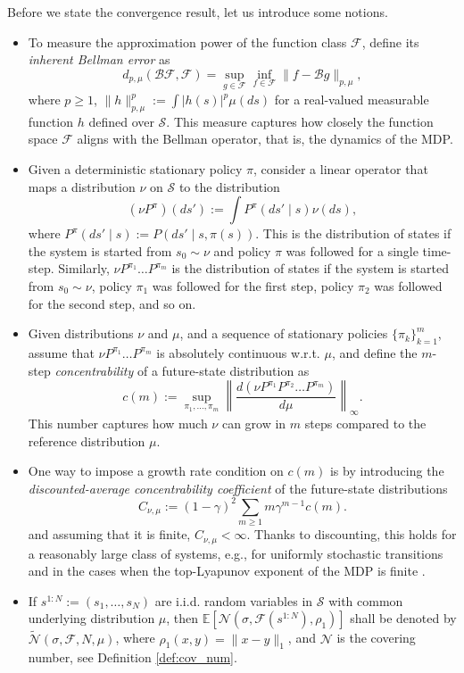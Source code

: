 \documentclass{article}
\numberwithin{equation}{section}
\newcommand{\cS}{\mathcal{S}}
\begin{document}
Before we state the convergence result, let us introduce some notions.
\begin{itemize}
    \item To measure the approximation power of the function class \(\mathcal{F}\), define its \textit{inherent Bellman error} as
    $$
    d_{p,\mu}(\mathcal{B} \mathcal{F}, \mathcal{F})=\sup _{g \in \mathcal{F}} \inf _{f \in \mathcal{F}}\|f-\mathcal{B} g\|_{p,\mu},
    $$
    where \(p\geq 1\), \(\|h\|_{p,\mu}^p:=\int |h(s)|^p \mu(ds)\) for a real-valued measurable function \(h\) defined over \(\cS\). This measure captures how closely the function space \(\mathcal{F}\) aligns with the Bellman operator, that is, the dynamics of the MDP.
    \item Given a deterministic stationary policy $\pi$, consider a linear operator that maps a distribution \(\nu\) on \(\cS\) to the distribution
    $$
    \left(\nu P^\pi\right)(d s'):=\int P^\pi(d s' \mid s) \nu(d s),
    $$
    where \( P^\pi(d s' \mid s):=P(d s' \mid s, \pi(s) )  \).
    This is the distribution of states if the system is started from \(s_0 \sim \nu\) and policy \(\pi\) was followed for a single time-step. Similarly, \( \nu P^{\pi_1} \ldots P^{\pi_m} \) is the distribution of states if the system is started from \(s_0 \sim \nu\), policy \(\pi_1\) was followed for the first step, policy \(\pi_2\) was followed for the second step, and so on.
    \item Given distributions \(\nu\) and \(\mu\), and a sequence of stationary policies \(\{\pi_k\}_{k=1}^m\), assume that \( \nu P^{\pi_1} \ldots P^{\pi_m} \) is absolutely continuous w.r.t. \(\mu\), and define the \(m\)-step \textit{concentrability} of a future-state distribution as
    \[
        c(m) := \sup _{\pi_1, \ldots, \pi_m}\left\|\frac{d\left(\nu P^{\pi_1} P^{\pi_2} \ldots P^{\pi_m}\right)}{d \mu}\right\|_{\infty}.
    \]
    This number captures how much \(\nu\) can grow in \(m\) steps compared to the reference distribution \(\mu\).
    \item One way to impose a growth rate condition on \(c(m)\) is by introducing the \textit{discounted-average concentrability coefficient} of the future-state distributions
    \[
        C_{\nu, \mu} := (1-\gamma)^2 \sum_{m \geq 1} m \gamma^{m-1} c(m).
    \]
    and assuming that it is finite, \( C_{\nu, \mu} < \infty \). Thanks to discounting, this holds for a reasonably large class of systems, e.g., for uniformly stochastic transitions \citep{munos2003error} and in the cases when the top-Lyapunov exponent of the MDP is finite \citep{munos2008finite}.
    \item If $s^{1: N} := \left(s_1, \ldots, s_N\right)$ are i.i.d. random variables in $\cS$ with common underlying distribution $\mu$, then $\mathbb{E}\left[\mathcal{N}\left(\sigma, \mathcal{F}\left(s^{1: N}\right), \rho_1 \right)\right]$ shall be denoted by $\tilde{\mathcal{N}}(\sigma, \mathcal{F}, N, \mu)$, where \( \rho_1(x,y)=\|x-y\|_1 \), and $\mathcal{N}$ is the covering number, see Definition \ref{def:cov_num}.\
\end{itemize}
\end{document}
